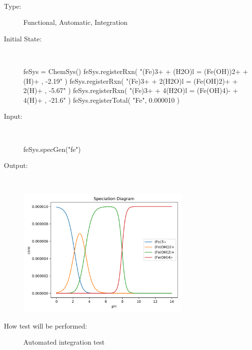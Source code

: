 \documentclass[12pt, titlepage]{article}
\newcounter{testnum} %
\begin{document}
\\
\begin{addmargin}[2em]{0em}
\begin{description}
\item[Type:] Functional, Automatic, Integration
					
\item[Initial State:] ~\newline

\begin{python}
feSys = ChemSys()
feSys.registerRxn(
  "(Fe)3+ + (H2O)l = (Fe(OH))2+ + (H)+ , -2.19"
)
feSys.registerRxn(
  "(Fe)3+ + 2(H2O)l = (Fe(OH)2)+ + 2(H)+ , -5.67"
)
feSys.registerRxn(
  "(Fe)3+ + 4(H2O)l = (Fe(OH)4)- + 4(H)+ , -21.6"
)
feSys.registerTotal(
  "Fe", 0.000010
)
\end{python}
					
\item[Input:] ~\newline

\begin{python}
feSys.specGen("fe")
\end{python}

					
\item[Output:] ~\newline

\includegraphics[width=0.7\textwidth]{fe_syst}

					
\item[How test will be performed:] Automated integration test\\
\end{description}
\end{addmargin}


\end{document}
